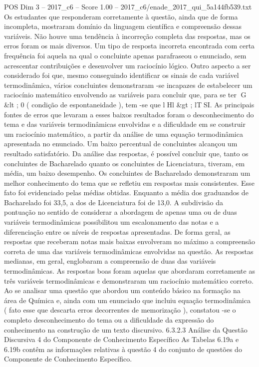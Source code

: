 \begin{textsample}{POS Dim 3 – 2017\_c6 – Score 1.00 – 2017\_c6/enade\_2017\_qui\_5a144fb539.txt}
Os estudantes que responderam corretamente à questão, ainda que de forma incompleta, mostraram domínio da linguagem científica e compreensão dessas variáveis.
Não houve uma tendência à incorreção completa das respostas, mas os erros foram os mais diversos.
Um tipo de resposta incorreta encontrada com certa frequência foi aquela na qual o concluinte apenas parafraseou o enunciado, sem acrescentar contribuições e desenvolver um raciocínio lógico.
Outro aspecto a ser considerado foi que, mesmo conseguindo identificar os sinais de cada variável termodinâmica, vários concluintes demonstraram -se incapazes de estabelecer um raciocínio matemático envolvendo as variáveis para concluir que, para se ter G \&lt ; 0 ( condição de espontaneidade ), tem -se que lHl \&gt ; lTSI.
As principais fontes de erros que levaram a esses baixos resultados foram o desconhecimento do tema e das variáveis termodinâmicas envolvidas e a dificuldade em se construir um raciocínio matemático, a partir da análise de uma equação termodinâmica apresentada no enunciado.
Um baixo percentual de concluintes alcançou um resultado satisfatório.
Da análise das respostas, é possível concluir que, tanto os concluintes de Bacharelado quanto os concluintes de Licenciatura, tiveram, em média, um baixo desempenho.
Os concluintes de Bacharelado demonstraram um melhor conhecimento do tema que se refletiu em respostas mais consistentes.
Esse fato foi evidenciado pelas médias obtidas.
Enquanto a média dos graduandos de Bacharelado foi 33,5, a dos de Licenciatura foi de 13,0.
A subdivisão da pontuação no sentido de considerar a abordagem de apenas uma ou de duas variáveis termodinâmicas possibilitou um escalonamento das notas e a diferenciação entre os níveis de respostas apresentadas.
De forma geral, as respostas que receberam notas mais baixas envolveram no máximo a compreensão correta de uma das variáveis termodinâmicas envolvidas na questão.
As respostas medianas, em geral, englobaram a compreensão de duas das variáveis termodinâmicas.
As respostas boas foram aquelas que abordaram corretamente as três variáveis termodinâmicas e demonstraram um raciocínio matemático correto.
Ao se analisar uma questão que abordou um conteúdo básico na formação na área de Química e, ainda com um enunciado que incluiu equação termodinâmica ( fato esse que descarta erros decorrentes de memorização ), constatou -se o completo desconhecimento do tema ou a dificuldade da expressão do conhecimento na construção de um texto discursivo. 6.3.2.3 Análise da Questão Discursiva 4 do Componente de Conhecimento Específico As Tabelas 6.19a e 6.19b contêm as informações relativas à questão 4 do conjunto de questões do Componente de Conhecimento Específico.

\end{textsample}
